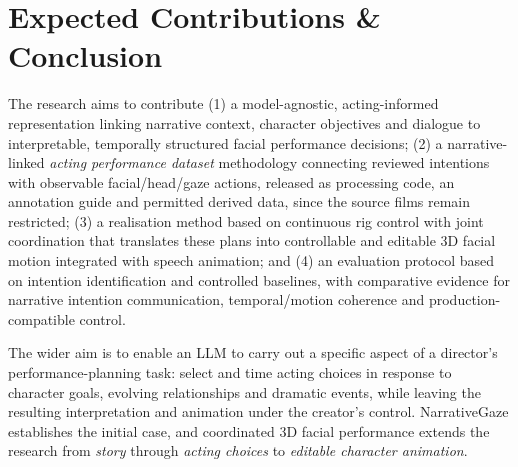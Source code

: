 \documentclass[11pt,a4paper]{article}
\begin{document}
\section{Expected Contributions \& Conclusion}

The research aims to contribute (1) a model-agnostic, acting-informed representation linking narrative context, character objectives and dialogue to interpretable, temporally structured facial performance decisions; (2) a narrative-linked \emph{acting performance dataset} methodology connecting reviewed intentions with observable facial/head/gaze actions, released as processing code, an annotation guide and permitted derived data, since the source films remain restricted; (3) a realisation method based on continuous rig control with joint coordination that translates these plans into controllable and editable 3D facial motion integrated with speech animation; and (4) an evaluation protocol based on intention identification and controlled baselines, with comparative evidence for narrative intention communication, temporal/motion coherence and production-compatible control.

The wider aim is to enable an LLM to carry out a specific aspect of a director's performance-planning task: select and time acting choices in response to character goals, evolving relationships and dramatic events, while leaving the resulting interpretation and animation under the creator's control. NarrativeGaze establishes the initial case, and coordinated 3D facial performance extends the research from \emph{story} through \emph{acting choices} to \emph{editable character animation}.



\end{document}
